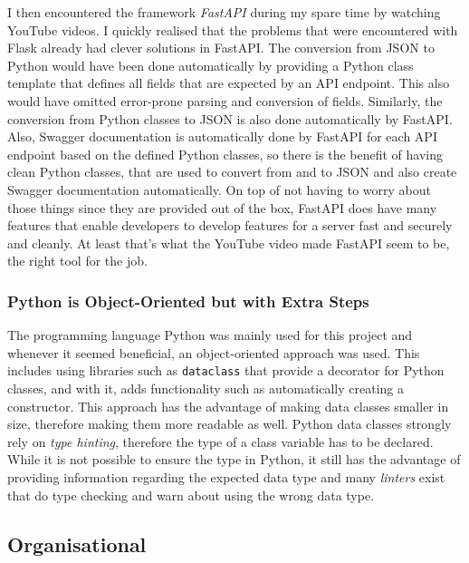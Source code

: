             I then encountered the framework \emph{FastAPI} \cite{FastAPI} during my spare time by watching YouTube videos. 
            I quickly realised that the problems that were encountered with Flask already had clever solutions in FastAPI.
            The conversion from JSON to Python would have been done automatically by providing a Python class template that defines all fields that are expected by an API endpoint. This also would have omitted error-prone parsing and conversion of fields.
            Similarly, the conversion from Python classes to JSON is also done automatically by FastAPI.
            Also, Swagger documentation is automatically done by FastAPI for each API endpoint based on the defined Python classes, 
            so there is the benefit of having clean Python classes, that are used to convert from and to JSON and also create Swagger documentation automatically.
            On top of not having to worry about those things since they are provided out of the box, FastAPI does have many features that enable developers to develop features for a server fast and securely and cleanly.
            At least that's what the YouTube video made FastAPI seem to be, the right tool for the job.
            
    \subsubsection{Python is Object-Oriented but with Extra Steps}
    \label{sec:python-is-oo}

        The programming language Python was mainly used for this project and whenever it seemed beneficial, an object-oriented approach was used.
        This includes using libraries such as \texttt{dataclass} that provide a decorator for Python classes, and with it, adds functionality such as automatically creating a constructor. This approach has the advantage of making data classes smaller in size, therefore making them more readable as well.
        Python data classes strongly rely on \emph{type hinting}, therefore the type of a class variable has to be declared. 
        While it is not possible to ensure the type in Python, it still has the advantage of providing information regarding the expected data type and many \emph{linters} exist that do type checking and warn about using the wrong data type.
    
    \subsection{Organisational}

